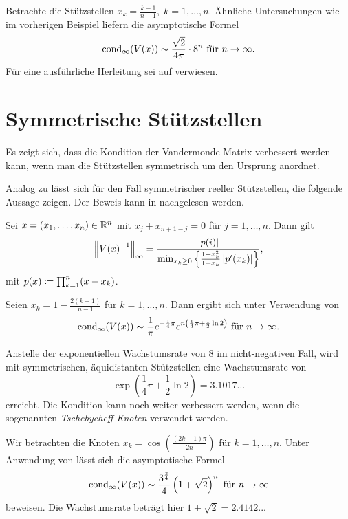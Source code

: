 \begin{example}
    Betrachte die Stützstellen $x_k = \frac{k-1}{n-1}, \; k=1, \dots, n$.
    Ähnliche Untersuchungen wie im vorherigen Beispiel liefern die
    asymptotische Formel
    \[
        \cond[\infty]{\Vand{x}} \sim \frac{\sqrt{2}}{4\pi} \cdot 8^n \text{ für } n \rightarrow \infty.
    \]
    Für eine ausführliche Herleitung sei auf \cite[S. 344f]{gautschi3}
    verwiesen.
\end{example}

\section{Symmetrische Stützstellen}
Es zeigt sich, dass die Kondition der Vandermonde-Matrix verbessert werden
kann, wenn man die Stützstellen symmetrisch um den Ursprung anordnet.

Analog zu  lässt sich für den Fall
symmetrischer reeller Stützstellen, die folgende Aussage zeigen.
Der Beweis kann in \cite[S. 341]{gautschi3} nachgelesen werden.
\begin{lemma}
    \label{lemma:symmetric_real_nodes}
    Sei $x = (x_1, \dots, x_n) \in \Rn$ mit $x_j + x_{n+1-j} = 0$ für $j = 1, \dots, n$.
    Dann gilt
    \[
        \norm{\Vand{x}^{-1}}_\infty = \frac{\abs{p(i)}}{\min_{x_k \geq 0} \left\{ \frac{1 + x_k^2}{1 + x_k} \abs{p^{\prime}(x_k)} \right\} },
    \]
    mit $p(x) \defeq \prod_{k=1}^{n} (x - x_k)$.
\end{lemma}

\begin{example}
    Seien $x_k = 1 - \frac{2(k-1)}{n-1}$ für ${k = 1, \dots, n}$.
    Dann ergibt sich unter Verwendung von 
    \[
        \cond[\infty]{\Vand{x}} \sim \frac{1}{\pi} e^{-\frac{1}{4} \pi} e^{n\left( \frac{1}{4} \pi + \frac{1}{2} \ln 2 \right)} \text{ für } n \rightarrow \infty.
    \]
\end{example}

Anstelle der exponentiellen Wachstumsrate von $8$ im nicht-negativen Fall, wird mit
symmetrischen, äquidistanten Stützstellen eine Wachstumsrate von
\[
    \exp \left( \frac{1}{4} \pi + \frac{1}{2} \ln 2 \right) = 3.1017\dots
\]
erreicht.
Die Kondition kann noch weiter verbessert werden, wenn die sogenannten
\emph{Tschebycheff Knoten} verwendet werden.

\begin{example}
    Wir betrachten die Knoten $x_k = \cos \left( \frac{(2k-1) \pi}{2n} \right)$
    für $k=1, \dots, n$.
    Unter Anwendung von  lässt sich die
    asymptotische Formel
    \[
        \cond[\infty]{\Vand{x}} \sim \frac{3^{\frac{3}{4}}}{4} \left( 1 + \sqrt{2} \right)^n \text{ für } n \rightarrow \infty
    \]
    beweisen.
    Die Wachstumsrate beträgt hier $1 + \sqrt{2} = 2.4142..$.
\end{example}


